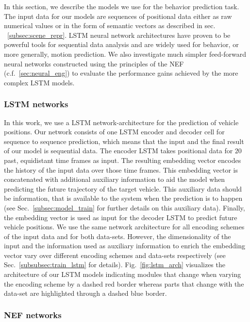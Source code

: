 In this section, we describe the models we use for the behavior prediction task.
The input data for our models are sequences of positional data either as raw numerical values or in the form of semantic vectors as described in sec. ~\ref{subsec:scene_repr}.
\ac{LSTM} neural network architectures have proven to be powerful tools for sequential data analysis and are widely used for behavior, or more generally, motion prediction.
We also investigate much simpler feed-forward neural networks constructed using the principles of the \acl{NEF} (c.f.~\ref{sec:neural_eng}) to evaluate the performance gains achieved by the more complex \ac{LSTM} models.

\subsubsection{\acs{LSTM} networks}
\label{subsubsec:lstm_models}
In this work, we use a \acf{LSTM} \cite{Hochreiter1997} network-architecture for the prediction of vehicle positions.
Our network consists of one \ac{LSTM} encoder and decoder cell for sequence to sequence prediction, which means that the input and the final result of our model is sequential data.
The encoder \ac{LSTM} takes positional data for $20$ past, equidistant time frames as input.
The resulting embedding vector encodes the history of the input data over those time frames.
This embedding vector is concatenated with additional auxiliary information to aid the model when predicting the future trajectory of the target vehicle.
This auxiliary data should be information, that is available to the system when the prediction is to happen (see Sec.~\ref{subsec:model_train} for further details on this auxiliary data).
Finally, the embedding vector is used as input for the decoder \ac{LSTM} to predict future vehicle positions.
We use the same network architecture for all encoding schemes of the input data and for both data-sets.
However, the dimensionality of the input and the information used as auxiliary information to enrich the embedding vector vary over different encoding schemes and data-sets respectively (see Sec.~\ref{subsubsec:train_lstm} for details).
Fig.~\ref{fig:lstm_arch} visualizes the architecture of our \ac{LSTM} models indicating modules that change when varying the encoding scheme by a dashed red border whereas parts that change with the data-set are highlighted through a dashed blue border.

\subsubsection{\acs{NEF} networks}
\label{subsubsec:nef_models}

